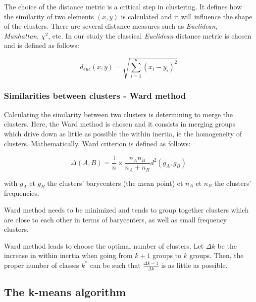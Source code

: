 \documentclass[
]{book}
\begin{document}
The choice of the distance metric is a critical step in clustering. It defines how the similarity of two elements \((x, y)\) is calculated and it will influence the shape of the clusters. There are several distance measures such as \emph{Euclidean}, \emph{Manhattan}, \(\chi^2\), etc. In our study the classical \emph{Euclidean} distance metric is chosen and is defined as follows:

\begin{equation}
  d_{euc}(x,y) = \sqrt{\sum_{i=1}^n(x_i - y_i)^2}
  \label{eq:euclidean}
\end{equation}

\hypertarget{similarities-between-clusters---ward-method}{%
\subsubsection*{Similarities between clusters - Ward method}\label{similarities-between-clusters---ward-method}}

Calculating the similarity between two clusters is determining to merge the clusters. Here, the Ward method \citep{UNSUPERVISED_CLASSIF} is chosen and it consists in merging groups which drive down as little as possible the within inertia, ie the homogeneity of clusters. Mathematically, Ward criterion is defined as follows:

\begin{equation}
  \Delta (A, B) = \frac{1}{n} \times \frac{n_A n_B}{n_A + n_B}d^2(g_A, g_B)
  \label{eq:ward}
\end{equation}

with \(g_A\) et \(g_B\) the clusters' barycenters (the mean point) et \(n_A\) et \(n_B\) the clusters' frequencies.

Ward method needs to be minimized and tends to group together clusters which are close to each other in terms of barycenters, as well as small frequency clusters.

Ward method leads to choose the optimal number of clusters. Let \(\Delta k\) be the increase in within inertia when going from \(k+1\) groups to \(k\) groups. Then, the proper number of classes \(k^*\) can be such that \(\frac{\Delta k-1}{\Delta k}\) is as little as possible.

\hypertarget{the-k-means-algorithm}{%
\subsection{The k-means algorithm}\label{the-k-means-algorithm}}
\end{document}
